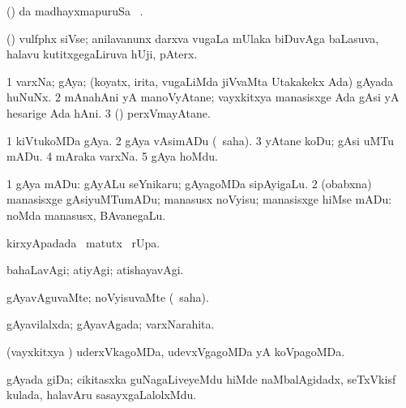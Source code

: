 \bentry
{} 
\gl{\kirx}
\expl{}
\bmng
(\pArxparx)  \kirx da madhayxmapuruSa \Eva\ \BU. 
\emng
\eentry

\bentry
{} 
\gl{\nA}
\expl{}
\bmng
(\ravi) vulfphx siVse; anilavanunx darxva \mo vugaLa mUlaka biDuvAga baLasuva, halavu kutitxgegaLiruva hUji, pAterx. 
\emng
\eentry

\bentry
{} 
\gl{\nA}
\expl{}
\bmng
\bnum
\num{1} varxNa; gAya; (koyatx, irita, \mo vugaLiMda jiVvaMta Utakakekx Ada) gAyada huNuNx. 
\num{2} mAnahAni yA manoVyAtane; vayxkitxya manasisxge Ada gAsi yA hesarige Ada hAni. 
\num{3} (\kAparx) perxVmayAtane. 
\enum
\emng

\noindent
\gl{\pagu}
\expl{}
\bmng
\bnum
\num{1}  kiVtukoMDa gAya. 
\num{2}  gAya vAsimADu (\rUpa\ saha). 
\num{3}  yAtane koDu; gAsi uMTu mADu. 
\num{4}  mAraka varxNa. 
\num{5}  gAya hoMdu. 
\enum
\emng
\eentry

\bentry
{} 
\gl{\sakirx}
\expl{}
\bmng
\bnum
\num{1} gAya mADu:  gAyALu seYnikaru; gAyagoMDa sipAyigaLu. 
\num{2} (obabxna) manasisxge gAsiyuMTumADu; manasusx noVyisu; manasisxge hiMse mADu:  noMda manasusx, BAvanegaLu. 
\enum
\emng
\eentry

\bentry
{} 
\gl{\kirx}
\expl{}
\bmng
{} kirxyApadada \BU\ matutx \BUkaq\ rUpa. 
\emng
\eentry

\bentry
{} 
\gl{\kirxvi}
\expl{}
\bmng
bahaLavAgi; atiyAgi; atishayavAgi. 
\emng
\eentry

\bentry
{} 
\gl{\kirxvi}
\expl{}
\bmng
gAyavAguvaMte; noVyisuvaMte (\rUpa\ saha). 
\emng
\eentry

\bentry
{} 
\gl{\gu}
\expl{}
\bmng
gAyavilalxda; gAyavAgada; varxNarahita. 
\emng
\eentry

\bentry
{} 
\gl{\gu}
\expl{}
\bmng
(vayxkitxya \vi) uderxVkagoMDa, udevxVgagoMDa yA koVpagoMDa. 
\emng
\eentry

\bentry
{} 
\gl{\nA}
\expl{}
\bmng
gAyada giDa; cikitasxka guNagaLiveyeMdu hiMde naMbalAgidadx, seTxVkisf kulada, halavAru sasayxgaLalolxMdu. 
\emng
\eentry

